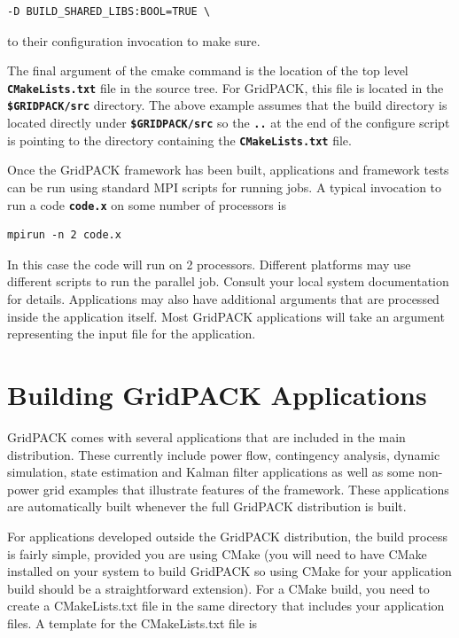 \documentclass[12pt]{report} %
\begin{document}
{
\color{red}
\begin{Verbatim}[fontseries=b]
    -D BUILD_SHARED_LIBS:BOOL=TRUE \
\end{Verbatim}
}

to their configuration invocation to make sure.

The final argument of the cmake command is the location of the top level \texttt{\textbf{CMakeLists.txt}} file in the source tree. For GridPACK, this file is located in the \texttt{\textbf{\$GRIDPACK/src}} directory. The above example assumes that the build directory is located directly under \texttt{\textbf{\$GRIDPACK/src}} so the \texttt{\textbf{..}} at the end of the configure script is pointing to the directory containing the \texttt{\textbf{CMakeLists.txt}} file.

Once the GridPACK framework has been built, applications and framework tests can be run using standard MPI scripts for running jobs. A typical invocation to run a code \texttt{\textbf{code.x}} on some number of processors is

{
\color{red}
\begin{Verbatim}[fontseries=b]
    mpirun -n 2 code.x
\end{Verbatim}
}

In this case the code will run on 2 processors. Different platforms may use different scripts to run the parallel job. Consult your local system documentation for details. Applications may also have additional arguments that are processed inside the application itself. Most GridPACK applications will take an argument representing the input file for the application.

\chapter{Building GridPACK Applications}

GridPACK comes with several applications that are included in the main distribution. These currently include power flow, contingency analysis, dynamic simulation, state estimation and Kalman filter applications as well as some non-power grid examples that illustrate features of the framework. These applications are automatically built whenever the full GridPACK distribution is built. 

For applications developed outside the GridPACK distribution, the build process is fairly simple, provided you are using CMake (you will need to have CMake installed on your system to build GridPACK so using CMake for your application build should be a straightforward extension). For a CMake build, you need to create a CMakeLists.txt file in the same directory that includes your application files. A template for the CMakeLists.txt file is
\end{document}
